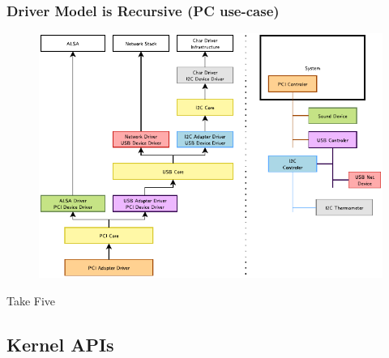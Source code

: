 \begin{frame}
  \frametitle{Driver Model is Recursive (PC use-case)}
  \vspace*{-3mm}
  \begin{figure}
    \centering
    \includegraphics[scale=0.95]{images/driver-model.pdf}
  \end{figure}
  \vspace*{-12mm}
\end{frame}

\begin{frame}[standout]
  Take Five
\end{frame}


\subsection{Kernel APIs}

